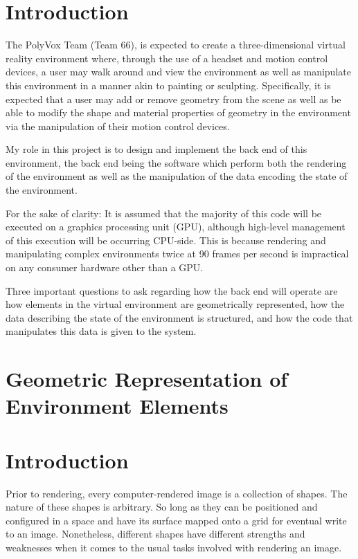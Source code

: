 \documentclass[onecolumn, draftclsnofoot,10pt, compsoc]{IEEEtran}
\begin{document}
\newpage
{}
\tableofcontents
\listoffigures
\listoftables
\clearpage

\section{Introduction}
The PolyVox Team (Team 66), is expected to create a three-dimensional virtual reality environment where, through the use of a headset and motion control devices, a user may walk around and view the environment as well as manipulate this environment in a manner akin to painting or sculpting.
Specifically, it is expected that a user may add or remove geometry from the scene as well as be able to modify the shape and material properties of geometry in the environment via the manipulation of their motion control devices.

My role in this project is to design and implement the back end of this environment, the back end being the software which perform both the rendering of the environment as well as the manipulation of the data encoding the state of the environment.

For the sake of clarity: It is assumed that the majority of this code will be executed on a graphics processing unit (GPU), although high-level management of this execution will be occurring CPU-side.
This is because rendering and manipulating complex environments twice at 90 frames per second is impractical on any consumer hardware other than a GPU.

Three important questions to ask regarding how the back end will operate are how elements in the virtual environment are geometrically represented, how the data describing the state of the environment is structured, and how the code that manipulates this data is given to the system.


\section{Geometric Representation of Environment Elements}
\section{Introduction}
Prior to rendering, every computer-rendered image is a collection of shapes. The nature of these shapes is arbitrary.
So long as they can be positioned and configured in a space and have its surface mapped onto a grid for eventual write to an image. Nonetheless, different shapes have different strengths and weaknesses when it comes to the usual tasks involved with rendering an image.
\end{document}
